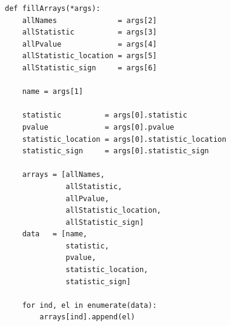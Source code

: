 \documentclass[a4paper, 14pt]{extarticle}
\begin{document}
\begin{lstlisting}
def fillArrays(*args):
    allNames              = args[2]
    allStatistic          = args[3]
    allPvalue             = args[4]
    allStatistic_location = args[5]
    allStatistic_sign     = args[6]

    name = args[1]

    statistic          = args[0].statistic
    pvalue             = args[0].pvalue
    statistic_location = args[0].statistic_location
    statistic_sign     = args[0].statistic_sign

    arrays = [allNames, 
              allStatistic, 
              allPvalue, 
              allStatistic_location, 
              allStatistic_sign]
    data   = [name, 
              statistic, 
              pvalue, 
              statistic_location, 
              statistic_sign]

    for ind, el in enumerate(data):
        arrays[ind].append(el)
\end{lstlisting}
\end{document}

